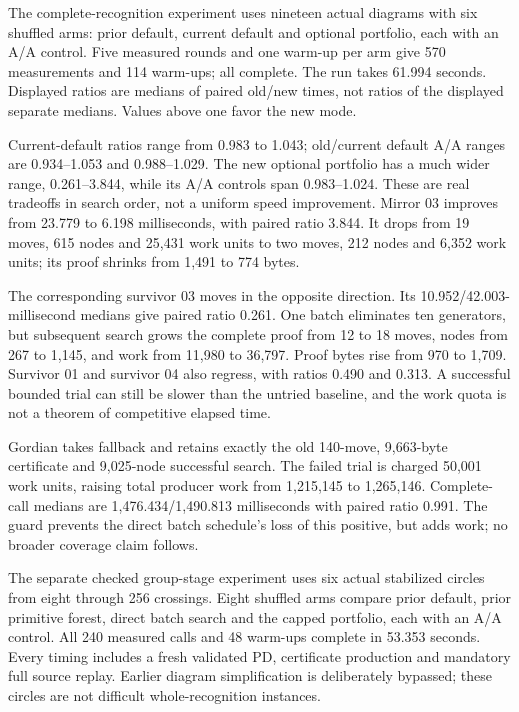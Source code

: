 

The complete-recognition experiment uses nineteen actual diagrams with
six shuffled arms: prior default, current default and optional portfolio,
each with an A/A control. Five measured rounds and one warm-up per arm
give 570 measurements and 114 warm-ups; all complete. The run takes
61.994 seconds. Displayed ratios are medians of paired old/new times,
not ratios of the displayed separate medians. Values above one favor
the new mode.

Current-default ratios range from 0.983 to 1.043; old/current default
A/A ranges are 0.934--1.053 and 0.988--1.029. The new optional portfolio
has a much wider range, 0.261--3.844, while its A/A controls span
0.983--1.024. These are real tradeoffs in search order, not a uniform
speed improvement. Mirror 03 improves from 23.779 to 6.198 milliseconds,
with paired ratio 3.844. It drops from 19 moves, 615 nodes and 25,431
work units to two moves, 212 nodes and 6,352 work units; its proof shrinks
from 1,491 to 774 bytes.

The corresponding survivor 03 moves in the opposite direction. Its
10.952/42.003-millisecond medians give paired ratio 0.261. One batch
eliminates ten generators, but subsequent search grows the complete proof
from 12 to 18 moves, nodes from 267 to 1,145, and work from 11,980 to
36,797. Proof bytes rise from 970 to 1,709. Survivor 01 and survivor 04
also regress, with ratios 0.490 and 0.313. A successful bounded trial
can still be slower than the untried baseline, and the work quota is not
a theorem of competitive elapsed time.

Gordian takes fallback and retains exactly the old 140-move, 9,663-byte
certificate and 9,025-node successful search. The failed trial is charged
50,001 work units, raising total producer work from 1,215,145 to
1,265,146. Complete-call medians are 1,476.434/1,490.813 milliseconds
with paired ratio 0.991. The guard prevents the direct batch schedule's
loss of this positive, but adds work; no broader coverage claim follows.



The separate checked group-stage experiment uses six actual stabilized
circles from eight through 256 crossings. Eight shuffled arms compare
prior default, prior primitive forest, direct batch search and the capped
portfolio, each with an A/A control. All 240 measured calls and 48 warm-ups
complete in 53.353 seconds. Every timing includes a fresh validated PD,
certificate production and mandatory full source replay. Earlier diagram
simplification is deliberately bypassed; these circles are not difficult
whole-recognition instances.

